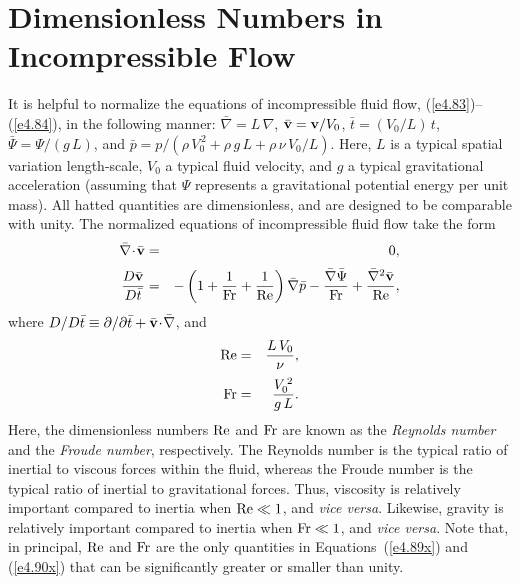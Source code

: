 \section{Dimensionless Numbers in Incompressible Flow}\label{sdim}
It is helpful to normalize the equations of incompressible fluid flow, (\ref{e4.83})--(\ref{e4.84}), in the following
manner: $\bar{\nabla} = L\,\nabla$, $\bar{\bf v} = {\bf v}/V_0$, $\bar{t} = (V_0/L)\,t$, 
$\bar{\Psi} = \Psi/(g\,L)$, and  $\bar{p} = p/(\rho\,V_0^{\,2} +\rho\,g\,L+ \rho\,\nu\,V_0/L)$. Here, $L$ is a typical spatial variation length-scale,  $V_0$ 
a typical fluid velocity, and $g$  a typical gravitational acceleration (assuming that $\Psi$ represents a gravitational
potential energy per unit mass). All hatted quantities are  dimensionless, and are designed to be comparable with unity. 
The normalized equations of incompressible fluid flow take the form
\begin{eqnarray}\label{e4.89x}
\bar{\nabla}\!\cdot\!\bar{\bf v} &=& 0,\\[0.5ex]
\frac{D\bar{\bf v}}{D\bar{t}}&=&   - \left(1+\frac{1}{{\rm Fr}}+\frac{1}{{\rm Re}}\right)\bar{\nabla} \bar{p}-\frac{\bar{\nabla}\bar{\Psi}}{\rm Fr} + \frac{\bar{\nabla}^2 \bar{\bf v}}{\rm Re},\label{e4.90x}
\end{eqnarray}
where $D/D\bar{t}\equiv \partial/\partial \bar{t} + \bar{\bf v}\!\cdot\!\bar{\nabla}$, and
\begin{eqnarray}
{\rm Re} &=& \frac{L\,V_0}{\nu},\\[0.5ex]
{\rm Fr} &=& \frac{V_0^{\,2}}{g\,L}.
\end{eqnarray}
Here, the dimensionless numbers ${\rm Re}$ and ${\rm Fr}$ are known as the {\em Reynolds number}\/ and the
{\em Froude number}, respectively. The Reynolds number is the typical ratio of inertial to viscous forces within the fluid,
whereas the Froude number is the typical ratio of inertial to gravitational forces.  Thus, viscosity is relatively important
compared to inertia when ${\rm Re}\ll 1$, and {\em vice versa}. Likewise, gravity is relatively important compared to
inertia when ${\rm Fr}\ll 1$, and
{\em vice versa}. 
Note that, in principal,  ${\rm Re}$ and ${\rm Fr}$
are the only quantities in Equations~(\ref{e4.89x}) and (\ref{e4.90x}) that can be significantly greater or smaller
than unity.

